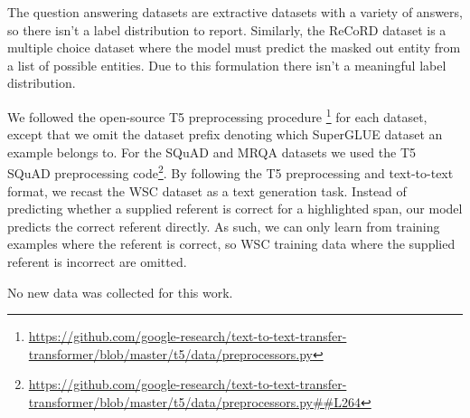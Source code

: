 \documentclass[11pt]{article}
\begin{document}
The question answering datasets are extractive datasets with a variety of answers, so there isn't a label distribution to report. Similarly, the ReCoRD dataset is a multiple choice dataset where the model must predict the masked out entity from a list of possible entities. Due to this formulation there isn't a meaningful label distribution.

We followed the open-source T5 preprocessing procedure{ \footnote{\url{https://github.com/google-research/text-to-text-transfer-transformer/blob/master/t5/data/preprocessors.py}}} for each dataset, except that we omit the dataset prefix denoting which SuperGLUE dataset an example belongs to. For the SQuAD and MRQA datasets we used the T5 SQuAD preprocessing code{\footnote{\url{https://github.com/google-research/text-to-text-transfer-transformer/blob/master/t5/data/preprocessors.py##L264}}}. By following the T5 preprocessing and text-to-text format, we recast the WSC dataset as a text generation task. Instead of predicting whether a supplied referent is correct for a highlighted span, our model predicts the correct referent directly. As such, we can only learn from training examples where the referent is correct, so WSC training data where the supplied referent is incorrect are omitted.

No new data was collected for this work.
\end{document}
